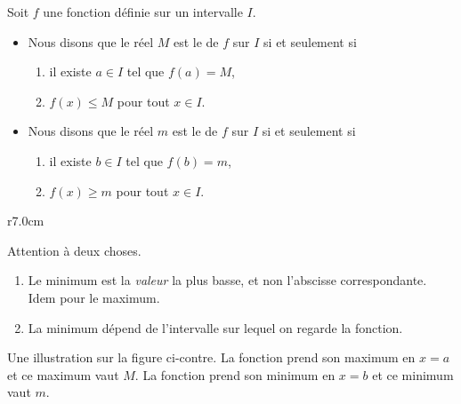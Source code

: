\begin{definition}
      Soit $f$ une fonction définie sur un intervalle \( I\).
      \begin{itemize}
            \item 
                Nous disons que le réel \( M\) est le  de \( f\) sur $I$ si et seulement si 
                \begin{enumerate}
                    \item
                        il existe $ a\in I$ tel que $f(a)=M$,
                    \item
                        \( f(x)\leq M\) pour tout $x\in I$.
                \end{enumerate}
                
          \item 
                Nous disons que le réel \( m\) est le  de \( f\) sur $I$ si et seulement si
                \begin{enumerate}
                    \item
                        il existe $ b\in I$ tel que $f(b)=m$,
                    \item
                        $f(x)\geq m$ pour tout \( x\in I\).
                \end{enumerate}
      \end{itemize}
\end{definition}

\begin{wrapfigure}[9]{r}{7.0cm}
   \vspace{-0.5cm}        %
   \centering
   
\end{wrapfigure}

\begin{remark}
    Attention à deux choses.
    \begin{enumerate}
        \item
            Le minimum est la \emph{valeur} la plus basse, et non l'abscisse correspondante. Idem pour le maximum. 
        \item
            La minimum dépend de l'intervalle sur lequel on regarde la fonction.
    \end{enumerate}
\end{remark}

Une illustration sur la figure ci-contre. La fonction prend son maximum en \( x=a\) et ce maximum vaut \( M\). La fonction prend son minimum en \( x=b\) et ce minimum vaut \( m\).
